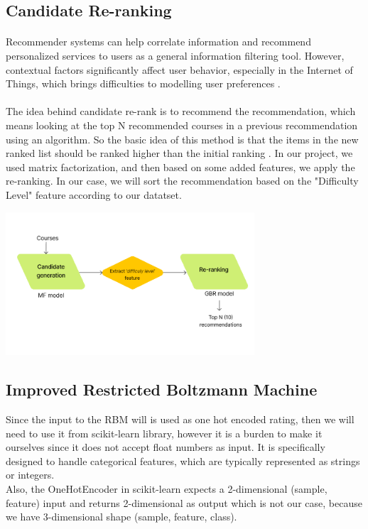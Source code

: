 \documentclass{cup-pan}
\begin{document}
\subsection{Candidate Re-ranking}
\label{sec:overview}
\paragraph{}
Recommender systems can help correlate information and recommend personalized services to users as a general information filtering tool. However, contextual factors significantly affect user behavior, especially in the Internet of Things, which brings difficulties to modelling user preferences \cite{13}.
\paragraph{}
The idea behind candidate re-rank is to recommend the recommendation, which means looking at the top N recommended courses in a previous recommendation using an algorithm. So the basic idea of this method is that the items in the new ranked list should be ranked higher than the initial ranking \cite{14}. In our project, we used matrix factorization, and then based on some added features, we apply the re-ranking. In our case, we will sort the recommendation based on the "Difficulty Level" feature according to our datatset.
\begin{center}
  \includegraphics[width=350px]{imgs/figures/17_2new.png}
  \vspace{.1cm}
\end{center}
\subsection{Improved Restricted Boltzmann Machine}
Since the input to the RBM will is used as one hot encoded rating, then we will need to use it from scikit-learn library, however it is a burden to make it ourselves since it does not accept float numbers as input. It is specifically designed to handle categorical features, which are typically represented as strings or integers.
\\
Also, the OneHotEncoder in scikit-learn expects a 2-dimensional (sample, feature) input and returns 2-dimensional as output which is not our case, because we have 3-dimensional shape (sample, feature, class).
\end{document}
